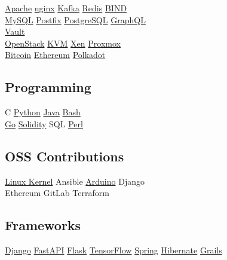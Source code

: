 \documentclass[]{willianpaixao-resume}
\begin{document}
\begin{minipage}[t]{0.34\textwidth}
\href{https://httpd.apache.org/}{Apache}\textbullet{}
\href{https://nginx.org/}{nginx}\textbullet{}
\href{https://kafka.apache.org/}{Kafka}\textbullet{}
\href{https://redis.io/}{Redis}\textbullet{}
\href{https://www.isc.org/bind/}{BIND}\\
\href{https://www.mysql.com/}{MySQL}\textbullet{}
\href{https://www.postfix.org/}{Postfix}\textbullet{}
\href{https://www.postgresql.org/}{PostgreSQL}\textbullet{}
\href{https://graphql.org/}{GraphQL}\\
\href{https://www.hashicorp.com/en/products/vault}{Vault}\\
\href{https://www.openstack.org/}{OpenStack}\textbullet{}
\href{https://linux-kvm.org/}{KVM}\textbullet{}
\href{https://xenproject.org/}{Xen} \textbullet{}
\href{https://www.proxmox.com/}{Proxmox}\\
\href{https://bitcoincore.org/}{Bitcoin}\textbullet{}
\href{https://ethereum.org/}{Ethereum}\textbullet{}
\href{https://polkadot.com/}{Polkadot}
\sectionsep

\subsection{Programming}
C\textbullet
\href{http://www.python.org}{Python}\textbullet{}
\href{https://www.oracle.com/java/}{Java}\textbullet{}
\href{https://www.gnu.org/software/bash/}{Bash}\\
\href{https://go.dev/}{Go}\textbullet{}
\href{https://soliditylang.org/}{Solidity}\textbullet{}
SQL\textbullet{}
\href{https://www.perl.org/}{Perl}
\sectionsep

\subsection{OSS Contributions}
\href{https://kernel.org/}{Linux Kernel}\textbullet{}
Ansible\textbullet{}
\href{https://www.arduino.cc/}{Arduino}\textbullet{}
Django\\
Ethereum\textbullet{}
GitLab\textbullet{}
Terraform
\sectionsep

\subsection{Frameworks}
\href{https://www.djangoproject.com/}{Django}\textbullet{}
\href{https://fastapi.tiangolo.com/}{FastAPI}\textbullet{}
\href{https://flask.palletsprojects.com/}{Flask}\textbullet{}
\href{https://www.tensorflow.org/}{TensorFlow}
\href{https://spring.io/}{Spring}\textbullet{}
\href{https://hibernate.org/}{Hibernate}\textbullet{}
\href{https://grails.org/}{Grails}
\sectionsep


\end{minipage}
\end{document}
